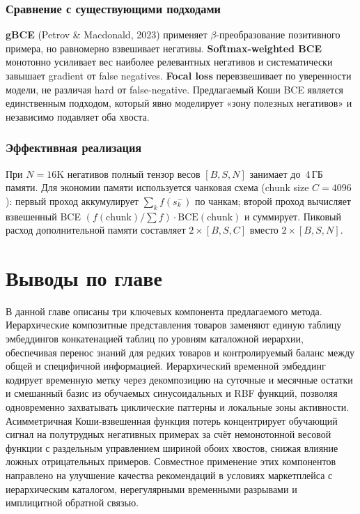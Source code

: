 \subsubsection{Сравнение с существующими подходами}

\textbf{gBCE} (Petrov \& Macdonald, 2023) применяет $\beta$-преобразование позитивного примера,
но равномерно взвешивает негативы. \textbf{Softmax-weighted BCE} монотонно усиливает вес наиболее
релевантных негативов и систематически завышает gradient от false negatives.
\textbf{Focal loss} перевзвешивает по уверенности модели, не различая hard от false-negative.
Предлагаемый Коши BCE является единственным подходом, который явно моделирует «зону полезных
негативов» и независимо подавляет оба хвоста.

\subsubsection{Эффективная реализация}

При $N = 16\text{K}$ негативов полный тензор весов $[B, S, N]$ занимает до~4\,ГБ памяти.
Для экономии памяти используется чанковая схема (chunk size $C = 4096$): первый проход
аккумулирует $\sum_k f(s_k^-)$ по чанкам; второй проход вычисляет взвешенный BCE
$(f(\text{chunk}) / \sum f) \cdot \mathrm{BCE}(\text{chunk})$ и суммирует. Пиковый расход
дополнительной памяти составляет $2 \times [B, S, C]$ вместо $2 \times [B, S, N]$.

\section{Выводы по главе}
\label{sec:ch2:summary}

В данной главе описаны три ключевых компонента предлагаемого метода.
Иерархические композитные представления товаров заменяют единую таблицу эмбеддингов конкатенацией
таблиц по уровням каталожной иерархии, обеспечивая перенос знаний для редких товаров и
контролируемый баланс между общей и специфичной информацией.
Иерархический временной эмбеддинг кодирует временную метку через декомпозицию на суточные и
месячные остатки и смешанный базис из обучаемых синусоидальных и RBF функций, позволяя
одновременно захватывать циклические паттерны и локальные зоны активности.
Асимметричная Коши-взвешенная функция потерь концентрирует обучающий сигнал на полутрудных
негативных примерах за счёт немонотонной весовой функции с раздельным управлением шириной обоих
хвостов, снижая влияние ложных отрицательных примеров.
Совместное применение этих компонентов направлено на улучшение качества рекомендаций в условиях
маркетплейса с иерархическим каталогом, нерегулярными временными разрывами и имплицитной обратной
связью.
